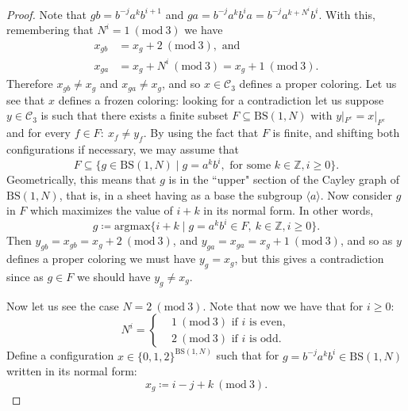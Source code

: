 \documentclass{aims}
\newcommand{\BS}[1][N]{\mathrm{BS}(1,#1)}
\theoremstyle{definition}
\begin{document}
\begin{proof}
	Note that $gb=b^{-j}a^k b^{i+1}$ and $ga=b^{-j}a^k b^ia=b^{-j}a^{k+N^i}b^i$. With this, remembering that $N^i =1 \ (\mathrm{mod} \ 3)$ we have
	\begin{align*}
	x_{gb}&=x_g+2 \ (\mathrm{mod} \ 3), \text{ and} \\
	x_{ga}&=x_g+N^i \ (\mathrm{mod} \ 3) =x_g+1 \ (\mathrm{mod} \ 3).
	\end{align*}
	Therefore $x_{gb}\neq x_g$ and $x_{ga}\neq x_g$, and so $x\in \mathcal{C}_3$ defines a proper coloring. Let us see that $x$ defines a frozen coloring: looking for a contradiction let us suppose $y\in \mathcal{C}_3$ is such that there exists a finite subset $F\subseteq \BS$ with $y|_{F^ c}=x|_{F^c}$ and for every $f\in F: \ x_f\neq y_f$. By using the fact that $F$ is finite, and shifting both configurations if necessary, we may assume that $$F\subseteq \{g\in \BS\mid g=a^kb^i, \text{ for some }k\in \mathbb{Z}, i\ge 0\}.$$ 
	Geometrically, this means that $g$ is in the ``upper" section of the Cayley graph of $\BS$, that is, in a sheet having as a base the subgroup $\langle a\rangle$. Now consider $g$ in $F$ which maximizes the value of $i+k$ in its normal form. In other words,
	$$
	g\coloneqq \mathrm{argmax}\{i+k\mid g=a^kb^i\in F, \ k\in \mathbb{Z}, i\ge 0 \}.
	$$
	Then $y_{gb}=x_{gb}=x_g+2\ (\mathrm{mod} \ 3)$, and $y_{ga}=x_{ga}=x_g+1\ (\mathrm{mod} \ 3)$, and so as $y$ defines a proper coloring we must have $y_g=x_g$, but this gives a contradiction since as $g\in F$ we should have $y_g\neq x_g$.
	
	
	Now let us see the case $N=2\ (\mathrm{mod} \ 3)$. Note that now we have that for $i\ge 0$:
	\begin{equation*}	
	N^i=\left\{ 
	\begin{aligned}
	&1 \ (\mathrm{mod} \ 3) \text{ if }i\text{ is even}, \\
	&2 \ (\mathrm{mod} \ 3) \text{ if }i\text{ is odd.} 
	\end{aligned}
	\right.
	\end{equation*}
	Define a configuration  $x\in \{0,1,2\}^{\BS}$ such that for $g=b^{-j}a^k b^i\in \BS$ written in its normal form:
	$$
	x_g\coloneqq i-j+k \ (\mathrm{mod} \ 3).
	$$
	

\end{proof}
\end{document}

